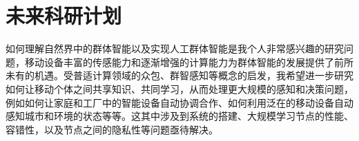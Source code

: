 \documentclass[12pt]{article}
\begin{document}
\section{未来科研计划}


如何理解自然界中的群体智能以及实现人工群体智能是我个人非常感兴趣的研究问题，移动设备丰富的传感能力和逐渐增强的计算能力为群体智能的发展提供了前所未有的机遇。受普适计算领域的众包、群智感知等概念的启发，我希望进一步研究如何让移动个体之间共享知识、共同学习，从而处理更大规模的感知和决策问题，例如如何让家庭和工厂中的智能设备自动协调合作、如何利用泛在的移动设备自动感知城市和环境的状态等等。这其中涉及到系统的搭建、大规模学习节点的性能、容错性，以及节点之间的隐私性等问题亟待解决。


{


}
\end{document}
